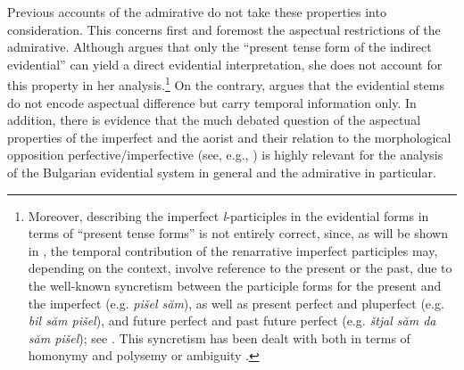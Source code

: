 \documentclass[output=paper,
colorlinks,
citecolor=brown,
newtxmath
]{langscibook}
\begin{document}
Previous accounts of the admirative do not take these properties into consideration. This concerns first and foremost the aspectual restrictions of the admirative. Although \citet[505]{Smirnova2013} argues that only the ``present tense form of the indirect evidential'' can yield a direct evidential interpretation, she does not account for this property in her analysis.\footnote{Moreover, describing the imperfect \textit{l}-participles in the evidential forms in terms of ``present tense forms'' is not entirely correct, since, as will be shown in , the temporal contribution of the renarrative imperfect participles may, depending on the context, involve reference to the present or the past, due to the well-known syncretism between the participle forms for the present and the imperfect (e.g. \textit{pišel săm}), as well as present perfect and pluperfect (e.g. \textit{bil săm pišel}), and future perfect and past future perfect (e.g. \textit{štjal săm da săm pišel}); see \citet[266]{Andrejcin1944}. This syncretism has been dealt with both in terms of homonymy \citep[e.g.][]{Andrejcin1944} and polysemy or ambiguity \citep[e.g.][]{Demina1959}.} On the contrary, \citeauthor{Smirnova2013} argues that the evidential stems do not encode aspectual difference but carry temporal information only. In addition, there is evidence that the much debated question  of the aspectual properties of the imperfect and the aorist and their relation to the morphological opposition perfective/imperfective (see, e.g., \citealt{Demina1976,Sonnenhauser2006}) is highly relevant for the analysis of the Bulgarian evidential system in general and the admirative in particular.
\end{document}
